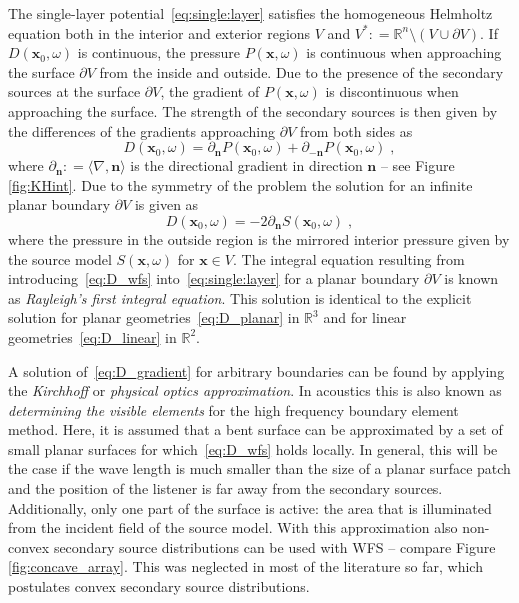 \documentclass[a4paper]{book}
\renewcommand{\vec}[1]{\mathbf{#1}}                  %
\newcommand{\x}{\vec{x}}                             %
\newcommand{\n}{\vec{n}}                             %
\newcommand{\defeq}{\mathrel{\!\mathop:}=}                        %
\newcommand{\R}{\mathbb{R}}                          %
\newcommand{\qc}{\;,}                                             %
\begin{document}
{The single-layer potential~\eqref{eq:single:layer} satisfies the homogeneous
Helmholtz equation
both in the interior and exterior regions $V$ and $V^*
\defeq \R^n \setminus (V \cup \partial V)$.  If $D(\x_0,\omega)$ is
continuous, the pressure $P(\x,\omega)$ is continuous when approaching the
surface $\partial V$ from the inside and outside.  Due to the presence of the
secondary sources at the surface $\partial V$, the gradient of $P(\x,\omega)$ is
discontinuous when approaching the surface.
The strength of the secondary sources is then given by the differences of the
gradients approaching $\partial V$ from both sides
as\cite[Compare][]{Fazi2013}
%
\begin{equation}
    D(\x_0,\omega) = \partial_\n
    P(\x_0,\omega) + \partial_{-\n} P(\x_0,\omega)\qc
    \label{eq:D_gradient}
\end{equation}
%
where
$\partial_\n\!\defeq\!\langle\nabla,\n\rangle$ is the directional gradient
in direction $\n$ -- see Figure\,\ref{fig:KHint}.
Due to the symmetry of the problem the solution for an infinite planar
boundary $\partial V$ is given as 
%
\begin{equation}
    D(\x_0,\omega) = -2 \partial_\n S(\x_0,\omega)\qc
    \label{eq:D_wfs}
\end{equation}
%
where the pressure in the outside region is the mirrored interior pressure given by the
source model $S(\x,\omega)$ for $\x \in V$.  The
integral equation resulting from introducing~\eqref{eq:D_wfs}
into~\eqref{eq:single:layer} for a planar boundary $\partial V$ is known as
{\em Rayleigh's first integral equation}. This solution is identical
to the explicit solution for planar geometries~\eqref{eq:D_planar} in $\R^3$ and for
linear geometries~\eqref{eq:D_linear} in $\R^2$.

A solution of~\eqref{eq:D_gradient} for  arbitrary boundaries can be
found by applying the \emph{Kirchhoff} or \emph{physical optics
approximation}.\cite[See][p.\,53--54]{Colton1983}
In acoustics this is also known as \emph{determining the visible elements} for
the high frequency boundary element
method.\cite[E.g.][]{Herrin2003}
Here, it is assumed that a
bent surface can be approximated by a set of small planar surfaces for
which~\eqref{eq:D_wfs} holds locally.  In general, this will be the case if the
wave length is much smaller than the size of a planar surface patch and the
position of the listener is far away from the secondary
sources.\cite[Compare the two assumptions in][made before
(15), which lead to the derivation of the same window function in a more explicit way.]{Spors2013}
Additionally, only one part of the surface is active: the area that is
illuminated from the incident field of the source model.
With this approximation
also non-convex secondary
source distributions can be used with
WFS -- compare
Figure\,\ref{fig:concave_array}.\cite[See the appendix
in][]{Lax1947}
This was neglected in most of the literature so far, which postulates
convex secondary source
distributions.\cite[E.g.][]{Spors2008}


}
\end{document}
